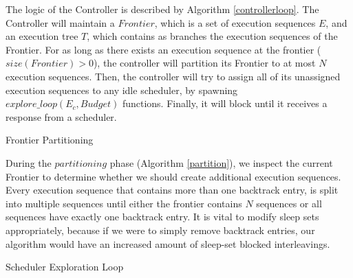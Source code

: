 The logic of the Controller is described by Algorithm \ref{controllerloop}. The Controller will maintain a $Frontier$, 
which is a set of execution sequences $E$, and an execution tree $T$, which contains
as branches the execution sequences of the Frontier. For as long as there exists an execution sequence at the frontier 
($size(Frontier)>0$), the controller will partition its Frontier to at most $N$ execution sequences. Then, the controller
will try to assign all of its unassigned execution sequences to any idle scheduler, by spawning $explore\_loop(E_c, Budget)$
functions. Finally, it will block until it receives a response from a scheduler.


\begin{algorithm}
    \caption{Frontier Partitioning}
    \label{partition}
\end{algorithm}

During the $partitioning$ phase (Algorithm \ref{partition}), we inspect the current Frontier to determine whether
we should create additional execution sequences. Every execution sequence that contains more than one backtrack entry,
is split into multiple sequences until either the frontier contains $N$ sequences or all sequences
have exactly one backtrack entry. It is vital to modify sleep sets appropriately, because if we were to simply
remove backtrack entries, our algorithm would have an increased amount of sleep-set blocked interleavings.

\begin{algorithm}
    \caption{Scheduler Exploration Loop}
    \label{explore_loop}
\end{algorithm}


